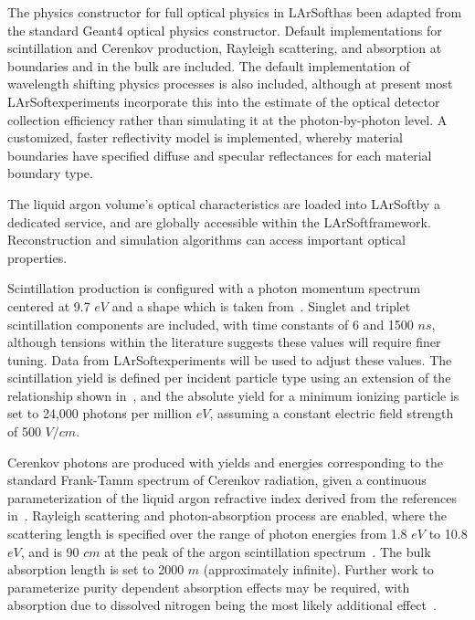 \documentclass[12pt]{elsarticle}
\newcommand{\larsoft}{LArSoft}
\begin{document}
The physics constructor for full optical physics in \larsoft has been adapted from the standard Geant4 optical physics constructor. Default implementations for scintillation and Cerenkov production, Rayleigh scattering, and absorption at boundaries and in the bulk are included. The default implementation of wavelength shifting physics processes is also included, although at present most \larsoft experiments incorporate this into the estimate of the optical detector collection efficiency rather than simulating it at the photon-by-photon level.  A customized, faster reflectivity model is implemented, whereby material boundaries have specified diffuse and specular reflectances for each material boundary type.  

The liquid argon volume's optical characteristics are loaded into \larsoft by a dedicated service, and are globally accessible within the \larsoft framework.  Reconstruction and simulation algorithms can access important optical properties.

Scintillation production is configured with a photon momentum spectrum centered at 9.7 $eV$ and a shape which is taken from~\cite{spectrum}.  Singlet and triplet scintillation components are included, with time constants of 6 and 1500 $ns$, although tensions within the literature suggests these values will require finer tuning.\cite{fastslow}\cite{fastslow2}\cite{fastslow3}\cite{fastslow4}
Data from \larsoft experiments will be used to adjust these values.  The scintillation yield is defined per incident particle type using an extension of the relationship shown in~\cite{scintyield}, and the absolute yield for a minimum ionizing particle is set to 24,000 photons per million $eV$, assuming a constant electric field strength of 500 $V/cm$. 

Cerenkov photons are produced with yields and energies corresponding to the standard Frank-Tamm spectrum of Cerenkov radiation, given a continuous parameterization of the liquid argon refractive index derived from the references in~\cite{RIndex}. Rayleigh scattering and photon-absorption process are enabled, where the scattering length is specified over the range of photon energies from 1.8 $eV$ to 10.8 $eV$, and is 90 $cm$ at the peak of the argon scintillation spectrum~\cite{Rlength}.  The bulk absorption length is set to 2000 $m$ (approximately infinite). Further work to parameterize purity dependent absorption effects may be required, with absorption due to dissolved nitrogen being the most likely additional effect~\cite{nitrogen}.
\end{document}
